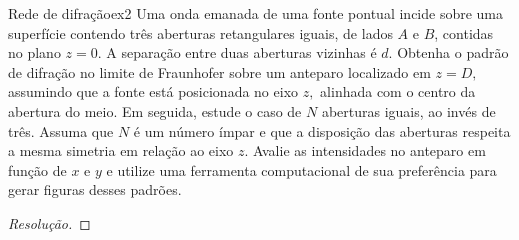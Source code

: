 \begin{exercício}{Rede de difração}{ex2}
    Uma onda emanada de uma fonte pontual incide sobre uma superfície contendo três aberturas retangulares iguais, de lados \(A\) e \(B\), contidas no plano \(z = 0\). A separação entre duas aberturas vizinhas é \(d\). Obtenha o padrão de difração no limite de Fraunhofer sobre um anteparo localizado em \(z = D,\) assumindo que a fonte está posicionada no eixo \(z,\) alinhada com o centro da abertura do meio. Em seguida, estude o caso de \(N\) aberturas iguais, ao invés de três. Assuma que \(N\) é um número ímpar e que a disposição das aberturas respeita a mesma simetria em relação ao eixo \(z\). Avalie as intensidades no anteparo em função de \(x\) e \(y\) e utilize uma ferramenta computacional de sua preferência para gerar figuras desses padrões.
\end{exercício}
\begin{proof}[Resolução]
    
\end{proof}
